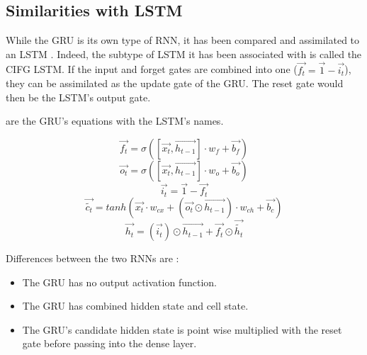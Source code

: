 \subsection{Similarities with \ac{LSTM}}

While the \ac{GRU} is its own type of \ac{RNN}, it has been compared and assimilated to an \ac{LSTM} \cite{nbLSTM}. Indeed, the subtype of \ac{LSTM} it has been associated with is called the \ac{CIFG} \ac{LSTM}. If the input and forget gates are combined into one ($\overrightarrow{f_t}=\overrightarrow{1}-\overrightarrow{i_t}$), they can be assimilated as the update gate of the \ac{GRU}. The reset gate would then be the \ac{LSTM}'s output gate.

 are the \ac{GRU}'s equations with the \ac{LSTM}'s names.

\begin{equation}\label{eq:lstmGru0}
  \overrightarrow{f_t}=\sigma ([\overrightarrow{x_t},\overrightarrow{h_{t-1}}] \cdot w_f + \overrightarrow{b_f})
\end{equation}
\begin{equation}\label{eq:lstmGru1}
  \overrightarrow{o_t}=\sigma ([\overrightarrow{x_t},\overrightarrow{h_{t-1}}] \cdot w_o + \overrightarrow{b_o})
\end{equation}
\begin{equation}\label{eq:lstmGru2}
  \overrightarrow{i_t}=\overrightarrow{1}-\overrightarrow{f_t}
\end{equation}
\begin{equation}\label{eq:lstmGru3}
  \overrightarrow{\tilde{c_t}}=tanh(\overrightarrow{x_t}\cdot w_{cx}+(\overrightarrow{o_t}\odot\overrightarrow{h_{t-1}}) \cdot w_{ch} + \overrightarrow{b_c})
\end{equation}
\begin{equation}\label{eq:lstmGru4}
  \overrightarrow{h_t}=(\overrightarrow{i_t})\odot \overrightarrow{h_{t-1}} + \overrightarrow{f_t}\odot \overrightarrow{\tilde{h_t}}
\end{equation}

Differences between the two \acp{RNN} are :
\begin{itemize}
  \item The \ac{GRU} has no output activation function.
  \item The \ac{GRU} has combined hidden state and cell state.
  \item The \ac{GRU}'s candidate hidden state is point wise multiplied with the reset gate before passing into the dense layer.
\end{itemize}
